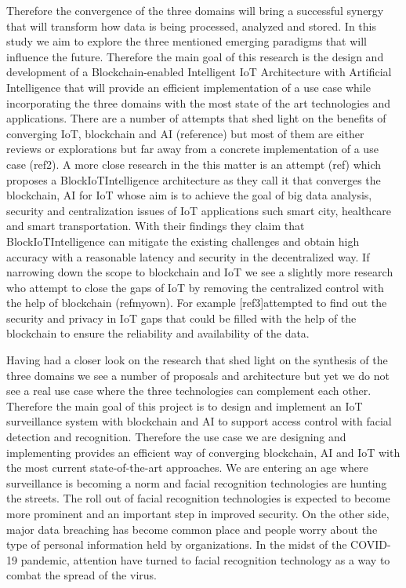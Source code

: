 Therefore the convergence of the three domains will bring a successful synergy that will transform how data is being processed, analyzed and stored. In this study we aim to explore the three mentioned emerging paradigms that will influence the future. Therefore the main goal of this research is the design and development of a Blockchain-enabled Intelligent IoT Architecture with Artificial Intelligence that will provide an efficient implementation of a use case while incorporating the three domains with the most state of the art technologies and applications. 
There are a number of attempts that shed light on the benefits of converging IoT, blockchain and AI (reference) but most of them are either reviews or explorations but far away from a concrete implementation of a use case (ref2). A more close research in the this matter is an attempt (ref) which proposes a BlockIoTIntelligence architecture as they call it that converges the blockchain, AI for IoT whose aim is to achieve the goal of big data analysis, security and centralization issues of IoT applications such smart city, healthcare and smart transportation. With their findings they claim that BlockIoTIntelligence can mitigate the existing challenges and obtain high accuracy with a reasonable latency and security in the decentralized way. 
If narrowing down the scope to blockchain and IoT we see a slightly more research who attempt to close the gaps of IoT by removing the centralized control with the help of blockchain (refmyown).
For example [ref3]attempted to find out the security and privacy in IoT  gaps that could be filled with the help of the blockchain to ensure the reliability and availability of the data. 

Having had a closer look on the research that shed light on the synthesis of the three domains we see a number of proposals and architecture but yet we do not see a real use case where the three technologies can complement each other. 
Therefore the main goal of this project is to design and implement an IoT surveillance system with blockchain and AI to support access control with facial detection and recognition. Therefore the use case we are designing and implementing provides an efficient way of converging blockchain, AI and IoT with the most current state-of-the-art approaches. 
We are entering an age where surveillance is becoming a norm and facial recognition technologies are hunting the streets. The roll out of facial recognition technologies is expected to become more prominent and an important step in improved security. On the other side, major data breaching has become common place and people worry about the type of personal information held by organizations. In the midst of the COVID-19 pandemic, attention have turned to facial recognition technology as a way to combat the spread of the virus.

